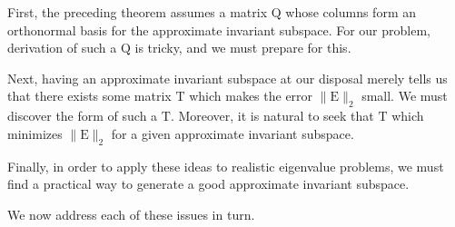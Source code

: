 \documentclass[12pt,letterpaper]{report}
\theoremstyle{plain}
\theoremstyle{definition}
\theoremstyle{remark}
\numberwithin{theorem}{chapter}
\numberwithin{claim}{chapter}
\numberwithin{equation}{chapter}
\numberwithin{conjecture}{chapter}
\newcommand\T{\ensuremath{\mathrm{T}}}
\newcommand\Q{\ensuremath{\mathrm{Q}}}
\newcommand\E{\ensuremath{\mathrm{E}}}
\newcommand\<{\ensuremath{\langle}}
\renewcommand\>{\ensuremath{\rangle}}
\begin{document}
First, the preceding theorem assumes a matrix $\Q$ whose columns form an
orthonormal basis for the approximate invariant subspace. For our problem, 
derivation of such a $\Q$ is tricky, and we must prepare for this. 

Next, having an approximate invariant subspace at our disposal merely tells us
that there exists some matrix $\T$ which makes the error 
%
%
%
%
$\|\E\|_2$ small. We must discover the form of such a $\T$. Moreover, it is
natural to seek that $\T$ which minimizes $\|\E\|_2$ for a given approximate
invariant subspace. 

Finally, in order to apply these ideas to realistic eigenvalue problems, we must
find a practical way to generate %
a good approximate invariant subspace. 

We now address each of these issues in turn.
\end{document}
